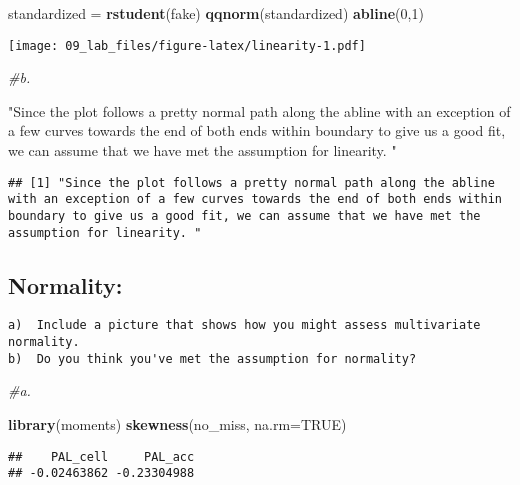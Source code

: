 \documentclass[
]{article}
\newenvironment{Shaded}{\begin{snugshade}}{\end{snugshade}}
\newcommand{\CommentTok}[1]{\textcolor[rgb]{0.56,0.35,0.01}{\textit{#1}}}
\newcommand{\DataTypeTok}[1]{\textcolor[rgb]{0.13,0.29,0.53}{#1}}
\newcommand{\DecValTok}[1]{\textcolor[rgb]{0.00,0.00,0.81}{#1}}
\newcommand{\KeywordTok}[1]{\textcolor[rgb]{0.13,0.29,0.53}{\textbf{#1}}}
\newcommand{\NormalTok}[1]{#1}
\newcommand{\OtherTok}[1]{\textcolor[rgb]{0.56,0.35,0.01}{#1}}
\newcommand{\StringTok}[1]{\textcolor[rgb]{0.31,0.60,0.02}{#1}}
\begin{document}
\begin{Shaded}
\begin{Highlighting}[]
\NormalTok{ standardized =}\StringTok{ }\KeywordTok{rstudent}\NormalTok{(fake)}
\KeywordTok{qqnorm}\NormalTok{(standardized)}
\KeywordTok{abline}\NormalTok{(}\DecValTok{0}\NormalTok{,}\DecValTok{1}\NormalTok{)}
\end{Highlighting}
\end{Shaded}

\texttt{[image: 09\_lab\_files/figure-latex/linearity-1.pdf]}

\begin{Shaded}
\begin{Highlighting}[]
\CommentTok{#b.}

\StringTok{"Since the plot follows a pretty normal path along the abline with an exception of a few curves towards the end of both ends within boundary to give us a good fit, we can assume that we have met the assumption for linearity. "}
\end{Highlighting}
\end{Shaded}

\begin{verbatim}
## [1] "Since the plot follows a pretty normal path along the abline with an exception of a few curves towards the end of both ends within boundary to give us a good fit, we can assume that we have met the assumption for linearity. "
\end{verbatim}

\hypertarget{normality}{%
\subsection{Normality:}\label{normality}}

\begin{verbatim}
a)  Include a picture that shows how you might assess multivariate normality.
b)  Do you think you've met the assumption for normality? 
\end{verbatim}

\begin{Shaded}
\begin{Highlighting}[]
\CommentTok{#a.}

\KeywordTok{library}\NormalTok{(moments)}
\KeywordTok{skewness}\NormalTok{(no_miss, }\DataTypeTok{na.rm=}\OtherTok{TRUE}\NormalTok{)}
\end{Highlighting}
\end{Shaded}

\begin{verbatim}
##    PAL_cell     PAL_acc 
## -0.02463862 -0.23304988
\end{verbatim}
\end{document}
